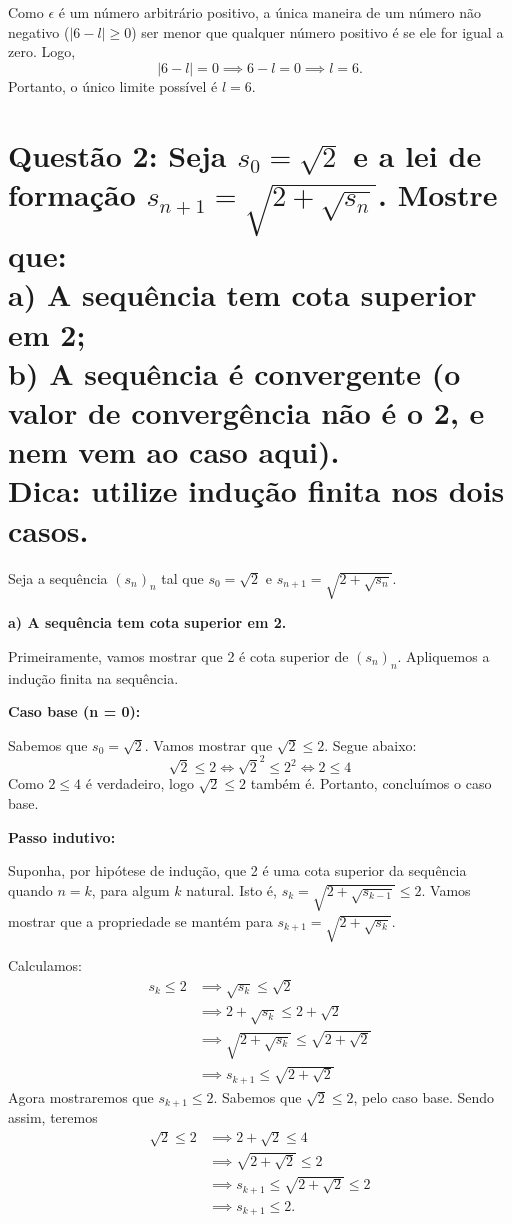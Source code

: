 \documentclass[12pt]{article}
\begin{document}
	Como $\epsilon$ é um número arbitrário positivo, a única maneira de um número não negativo ($|6 - l| \geq 0$) ser menor que qualquer número positivo é se ele for igual a zero. Logo,
	\[
	|6 - l| = 0 \implies 6 - l = 0 \implies l = 6.
	\]
	Portanto, o único limite possível é $l = 6$. \blacksquare
	
	\section*{Questão 2: Seja $s_0 = \sqrt{2}$ e a lei de formação $s_{n + 1} = \sqrt{2 + \sqrt{s_n}}$. Mostre que: \\
	a) A sequência tem cota superior em 2; \\
	b) A sequência é convergente (o valor de convergência não é o 2, e nem vem ao caso aqui). \\
	Dica: utilize indução finita nos dois casos.
	}
	
	Seja a sequência $(s_n)_n$ tal que $s_0 = \sqrt{2}$ e $s_{n + 1} = \sqrt{2 + \sqrt{s_n}}$.
	
	\textbf{a) A sequência tem cota superior em 2.}
	
	Primeiramente, vamos mostrar que 2 é cota superior de $(s_n)_n$. Apliquemos a indução finita na sequência.
	
	\textbf{Caso base (n = 0):}
	
	Sabemos que $s_0 = \sqrt{2}$. Vamos mostrar que $\sqrt{2} \leq 2$. Segue abaixo:
	\[
	\sqrt{2} \leq 2 \iff \sqrt{2}^2 \leq 2^2 \iff 2 \leq 4
	\]
	Como $2 \leq 4$ é verdadeiro, logo $\sqrt{2} \leq 2$ também é. Portanto, concluímos o caso base.
	
	\textbf{Passo indutivo:}
	
	Suponha, por hipótese de indução, que 2 é uma cota superior da sequência quando $n = k$, para algum $k$ natural. Isto é, $s_k = \sqrt{2 + \sqrt{s_{k - 1}}} \leq 2$. Vamos mostrar que a propriedade se mantém para $s_{k + 1} = \sqrt{2 + \sqrt{s_k}}$.
	
	Calculamos:
	\begin{align*}
		s_k \leq 2
		&\implies \sqrt{s_k} \leq \sqrt{2} \\
		&\implies 2 + \sqrt{s_k} \leq 2 + \sqrt{2} \\
		&\implies \sqrt{2 + \sqrt{s_k}} \leq \sqrt{2 + \sqrt{2}} \\
		&\implies s_{k + 1} \leq \sqrt{2 + \sqrt{2}}
	\end{align*}
	Agora mostraremos que $s_{k + 1} \leq 2$. Sabemos que $\sqrt{2} \leq 2$, pelo caso base. Sendo assim, teremos
	\begin{align*}
		\sqrt{2} \leq 2
		&\implies 2 + \sqrt{2} \leq 4 \\
		&\implies \sqrt{2 + \sqrt{2}} \leq 2 \\
		&\implies s_{k + 1} \leq \sqrt{2 + \sqrt{2}} \leq 2 \\
		&\implies s_{k + 1} \leq 2.
	\end{align*}
	
\end{document}
